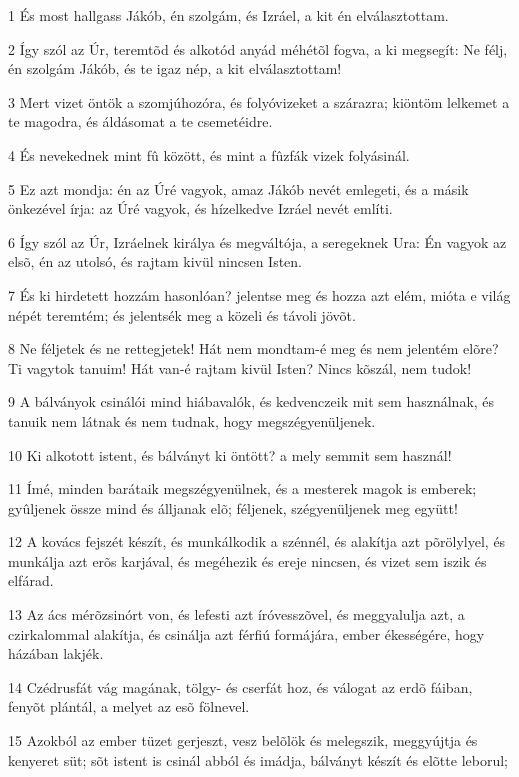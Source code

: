 \par 1 És most hallgass Jákób, én szolgám, és Izráel, a kit én elválasztottam.
\par 2 Így szól az Úr, teremtõd és alkotód anyád méhétõl fogva, a ki megsegít: Ne félj, én szolgám Jákób, és te igaz nép, a kit elválasztottam!
\par 3 Mert vizet öntök a szomjúhozóra, és folyóvizeket a szárazra; kiöntöm lelkemet a te magodra, és áldásomat a te csemetéidre.
\par 4 És nevekednek mint fû között, és mint a fûzfák vizek folyásinál.
\par 5 Ez azt mondja: én az Úré vagyok, amaz Jákób nevét emlegeti, és a másik önkezével írja: az Úré vagyok, és hízelkedve Izráel nevét említi.
\par 6 Így szól az Úr, Izráelnek királya és megváltója, a seregeknek Ura: Én vagyok az elsõ, én az utolsó, és rajtam kivül nincsen Isten.
\par 7 És ki hirdetett hozzám hasonlóan? jelentse meg és hozza azt elém, mióta e világ népét teremtém; és jelentsék meg a közeli és távoli jövõt.
\par 8 Ne féljetek és ne rettegjetek! Hát nem mondtam-é meg és nem jelentém elõre? Ti vagytok tanuim! Hát van-é rajtam kivül Isten? Nincs kõszál, nem tudok!
\par 9 A bálványok csinálói mind hiábavalók, és kedvenczeik mit sem használnak, és tanuik nem látnak és nem tudnak, hogy megszégyenüljenek.
\par 10 Ki alkotott istent, és bálványt ki öntött? a mely semmit sem használ!
\par 11 Ímé, minden barátaik megszégyenülnek, és a mesterek magok is emberek; gyûljenek össze mind és álljanak elõ; féljenek, szégyenüljenek meg együtt!
\par 12 A kovács fejszét készít, és munkálkodik a szénnél, és alakítja azt põrölylyel, és munkálja azt erõs karjával, és megéhezik és ereje nincsen, és vizet sem iszik és elfárad.
\par 13 Az ács mérõzsinórt von, és lefesti azt íróvesszõvel, és meggyalulja azt, a czirkalommal alakítja, és csinálja azt férfiú formájára, ember ékességére, hogy házában lakjék.
\par 14 Czédrusfát vág magának, tölgy- és cserfát hoz, és válogat az erdõ fáiban, fenyõt plántál, a melyet az esõ fölnevel.
\par 15 Azokból az ember tüzet gerjeszt, vesz belõlök és melegszik, meggyújtja és kenyeret süt; sõt istent is csinál abból és imádja, bálványt készít és elõtte leborul;
